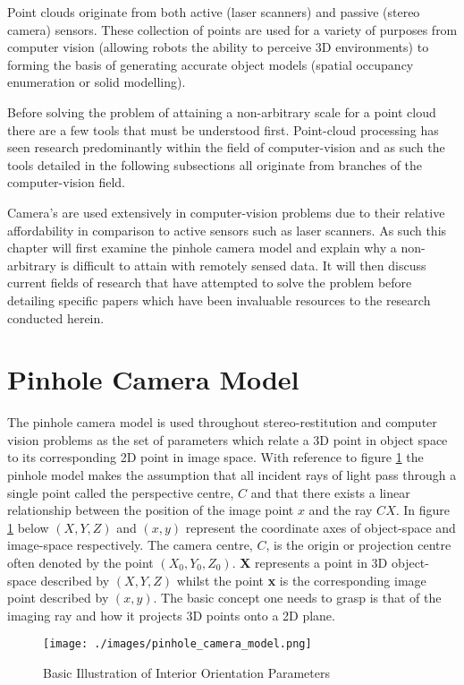 Point clouds originate from both active (laser scanners) and passive (stereo camera) sensors. These collection of points are used for a variety of purposes from computer vision (allowing robots the ability to perceive 3D environments) to forming the basis of generating accurate object models (spatial occupancy enumeration or solid modelling). 

Before solving the problem of attaining a non-arbitrary scale for a point cloud there are a few tools that must be understood first. Point-cloud processing has seen research predominantly within the field of computer-vision and as such the tools detailed in the following subsections all originate from branches of the computer-vision field.

Camera's are used extensively in computer-vision problems due to their relative affordability in comparison to active sensors such as laser scanners. As such this chapter will first examine the pinhole camera model and explain why a non-arbitrary is difficult to attain with remotely sensed data. It will then discuss current fields of research that have attempted to solve the problem before detailing specific papers which have been invaluable resources to the research conducted herein. 


\section{Pinhole Camera Model\label{pinholechapter}}
The pinhole camera model is used throughout stereo-restitution and computer vision problems as the set of parameters which relate a 3D point in object space to its corresponding 2D point in image space. With reference to figure \ref{pinhole} the pinhole model makes the assumption that all incident rays of light pass through a single point called the perspective centre, $C$ and that there exists a linear relationship between the position of the image point $x$ and the ray $CX$. In figure \ref{pinhole} below $(X,Y,Z)$ and $(x,y)$ represent the coordinate axes of object-space and image-space respectively. The camera centre, $C$, is the origin or projection centre often denoted by the point $(X_0,Y_0,Z_0)$. \textbf{X} represents a point in 3D object-space described by $(X,Y,Z)$ whilst the point \textbf{x} is the corresponding image point described by $(x,y)$. The basic concept one needs to grasp is that of the imaging ray and how it projects 3D points onto a 2D plane.

\begin{figure}[h!]
\begin{center}
\texttt{[image: ./images/pinhole\_camera\_model.png]}
\end{center}
\caption{Basic Illustration of Interior Orientation Parameters \citep{nozick_matrices_2015}\label{pinhole}}
\end{figure}

